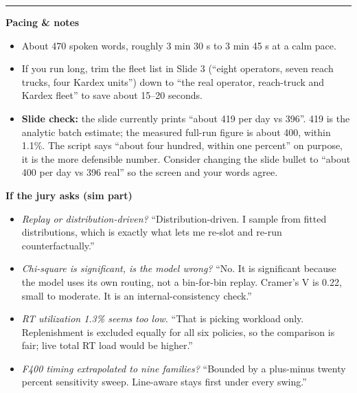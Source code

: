 \documentclass[11pt]{article}
\begin{document}
\bigskip
{\color{navy}\rule{\linewidth}{1.1pt}}
\par\smallskip
{\color{navy}\bfseries Pacing \& notes}
\begin{itemize}[leftmargin=1.4em,itemsep=2pt]
  \item About 470 spoken words, roughly 3 min 30 s to 3 min 45 s at a calm pace.
  \item If you run long, trim the fleet list in Slide 3 (``eight operators, seven reach
        trucks, four Kardex units'') down to ``the real operator, reach-truck and Kardex
        fleet'' to save about 15--20 seconds.
  \item \textbf{Slide check:} the slide currently prints ``about 419 per day vs 396''.
        419 is the analytic batch estimate; the measured full-run figure is about 400,
        within 1.1\%. The script says ``about four hundred, within one percent'' on
        purpose, it is the more defensible number. Consider changing the slide bullet to
        ``about 400 per day vs 396 real'' so the screen and your words agree.
\end{itemize}

\par\smallskip
{\color{navy}\bfseries If the jury asks (sim part)}
\begin{itemize}[leftmargin=1.4em,itemsep=2pt]
  \item \emph{Replay or distribution-driven?} ``Distribution-driven. I sample from
        fitted distributions, which is exactly what lets me re-slot and re-run
        counterfactually.''
  \item \emph{Chi-square is significant, is the model wrong?} ``No. It is significant
        because the model uses its own routing, not a bin-for-bin replay. Cramer's V is
        0.22, small to moderate. It is an internal-consistency check.''
  \item \emph{RT utilization 1.3\% seems too low.} ``That is picking workload only.
        Replenishment is excluded equally for all six policies, so the comparison is
        fair; live total RT load would be higher.''
  \item \emph{F400 timing extrapolated to nine families?} ``Bounded by a plus-minus
        twenty percent sensitivity sweep. Line-aware stays first under every swing.''
\end{itemize}
\end{document}
